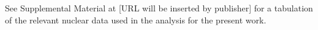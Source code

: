 \documentclass[onecolumn,epjc3]{svjour3}
\begin{document}
{\small  See Supplemental Material at [URL will be inserted by publisher] for a tabulation of the relevant nuclear data used in the analysis for the present work.}



% 
% 
\appendix







% 



% 


\end{document}
